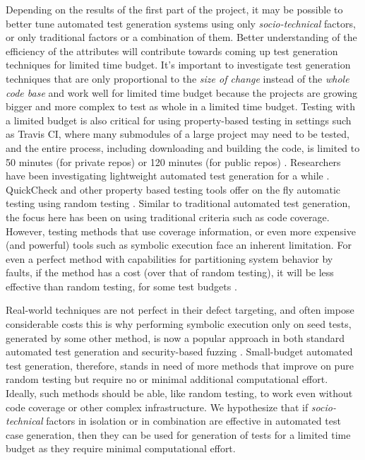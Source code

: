 \documentclass[10pt]{article}
\begin{document}
 Depending on the results of the first part of the project, it may be possible to better tune automated test generation systems using only \emph{socio-technical} factors, or only traditional factors or a combination of them. Better understanding of the efficiency of the attributes will contribute towards coming up test generation techniques for limited time budget. It's important to investigate test generation techniques that are only proportional to the \emph{size of change} instead of the \emph{whole code base} and work well for limited time budget because the projects are growing bigger and more complex to test as whole in a limited time budget. Testing with a limited budget is also critical for using property-based testing in settings such as Travis CI, where many submodules of a large project may need to be tested, and the entire process, including downloading and building the code, is limited to 50 minutes (for private repos) or 120 minutes (for public repos) \cite{TravisDoc}. Researchers have been investigating lightweight automated test generation for a while \cite{groce2012lightweight}. QuickCheck \cite{claessen2011quickcheck} and other property based testing tools \cite{papadakis2011proper} offer on the fly automatic testing using random testing \cite{bohme2014efficiency}. Similar to traditional automated test generation, the focus here has been on using traditional criteria such as code coverage. However, testing methods that use coverage information, or even more expensive (and powerful) tools such as symbolic execution \cite{cadar2008klee} face an inherent limitation. For even a perfect method with capabilities for partitioning system behavior by faults, if the method has a cost (over that of random testing), it will be less effective than
random testing, for some test budgets \cite{AutoEfficiency}. 

Real-world techniques are not perfect in their defect targeting, and often impose considerable costs this is why performing symbolic execution only on seed tests, generated by some other method, is now a popular approach in both standard automated test generation and security-based fuzzing \cite{marinescu2012make}. Small-budget automated test generation, therefore, stands in need of more methods that improve on pure random testing but require no or minimal additional computational effort. Ideally, such methods should be able, like random testing, to work even without code coverage or other complex infrastructure. We hypothesize that if \emph{socio-technical} factors in isolation or in combination are effective in automated test case generation, then they can be used for generation of tests for a limited time budget as they require minimal computational effort. 
\end{document}
